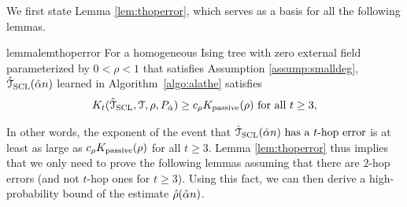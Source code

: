 We first state Lemma \ref{lem:thoperror}, which serves as a basis for all the following lemmas.
\begin{restatable}{lemma}{lemthoperror}
\label{lem:thoperror}
For a homogeneous Ising tree with zero external field parameterized by $0<\rho<1$ that satisfies Assumption \ref{assump:smalldeg}, $\hat{\mathcal{T}}_{\rm{SCL}}(\hat{\alpha} n)$ learned in Algorithm~\ref{algo:alathe} satisfies
\begin{align}
	K _{t}(\hat{\mathcal{T}}_{{\rm SCL}},\mathcal{T},\rho,P_{\hat{\alpha}})\geq c_{\rho}K _{{\rm passive}}(\rho) \text{ for all }t\geq 3,
\end{align}
\end{restatable}
In other words, the exponent of the event that $\hat{\mathcal{T}}_{\rm{SCL}}(\hat{\alpha} n) \text{ has a }t\text{-hop error}$ is at least as large as $c_{\rho}K _{{\rm passive}}(\rho)$ for all $t\geq 3$. Lemma \ref{lem:thoperror} thus implies 
that we only need to prove the following lemmas assuming that 
there are  $2$-hop errors (and not $t$-hop ones for $t\ge3$). 
Using this fact, we can then derive a high-probability bound of the estimate $\hat{\rho}(\hat{\alpha} n)$.

